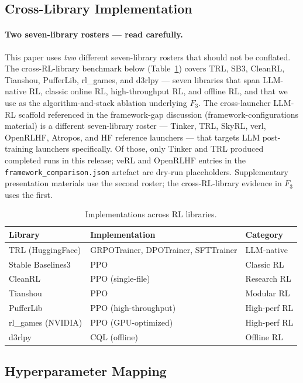 \documentclass{article}
\begin{document}
\subsection{Cross-Library Implementation}

\paragraph{Two seven-library rosters --- read carefully.}
This paper uses \emph{two} different seven-library rosters that
should not be conflated. The cross-RL-library benchmark below
(Table~\ref{tab:implementations}) covers TRL, SB3, CleanRL, Tianshou,
PufferLib, rl\_games, and d3rlpy --- seven libraries that span
LLM-native RL, classic online RL, high-throughput RL, and offline RL,
and that we use as the algorithm-and-stack ablation underlying $F_3$.
The cross-launcher LLM-RL scaffold referenced in the framework-gap
discussion (framework-configurations material) is a different seven-library
roster --- Tinker, TRL, SkyRL, verl, OpenRLHF, Atropos, and HF
reference launchers --- that targets LLM post-training launchers
specifically. Of those, only Tinker and TRL produced completed
runs in this release; veRL and OpenRLHF entries in the
\texttt{framework\_comparison.json} artefact are dry-run
placeholders. Supplementary presentation materials use the second roster; the
cross-RL-library evidence in $F_3$ uses the first.


\begin{table}[htbp]
\centering
\caption{Implementations across RL libraries.}
\label{tab:implementations}
\begin{tabular}{lll}
\toprule
\textbf{Library} & \textbf{Implementation} & \textbf{Category} \\
\midrule
TRL (HuggingFace) & GRPOTrainer, DPOTrainer, SFTTrainer & LLM-native \\
Stable Baselines3 & PPO & Classic RL \\
CleanRL & PPO (single-file) & Research RL \\
Tianshou & PPO & Modular RL \\
PufferLib & PPO (high-throughput) & High-perf RL \\
rl\_games (NVIDIA) & PPO (GPU-optimized) & High-perf RL \\
d3rlpy & CQL (offline) & Offline RL \\
\bottomrule
\end{tabular}
\end{table}

\subsection{Hyperparameter Mapping}
\end{document}
